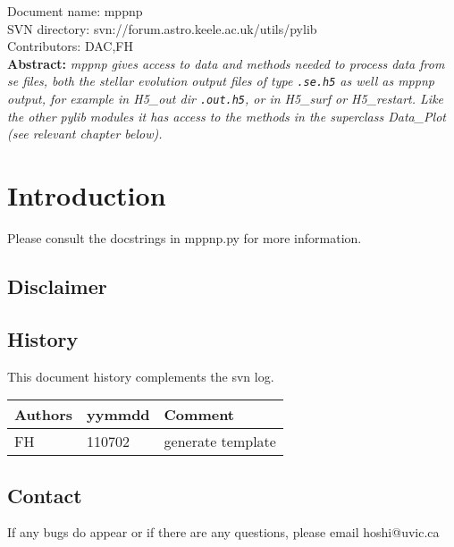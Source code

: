 \renewcommand{\ndoctitle}{mppnp.py: The python workhorse to get, plot and analyse se files} 
\renewcommand{\ndocname}{mppnp}                      
\renewcommand{\svndir}{svn://forum.astro.keele.ac.uk/utils/pylib}  
\renewcommand{\ndoccontribs}{DAC,FH}



Document name: \ndocname \\
SVN directory: \svndir\\
Contributors: \ndoccontribs\\



{  \textbf{Abstract:} \slshape
mppnp gives access to data and methods needed to process data from se files, both the stellar evolution output files of type \texttt{.se.h5} as well as mppnp output, for example in H5\_out dir \texttt{.out.h5}, or in H5\_surf or H5\_restart. Like the other pylib modules it has access to the methods in the superclass Data\_Plot (see relevant chapter below). 
}

\section{Introduction}
Please consult the docstrings in mppnp.py for more information.
\subsection{Disclaimer}
		
\subsection{History} 
This document history complements the svn log.

\begin{tabular*}{\textwidth}{lll}
\hline
Authors & yymmdd & Comment \\
\hline
FH & 110702 & generate template \\
\hline
\end{tabular*}


\subsection{Contact}
If any bugs do appear or if there are any questions, please email hoshi@uvic.ca
\begin{verbatim}

\end{verbatim}


